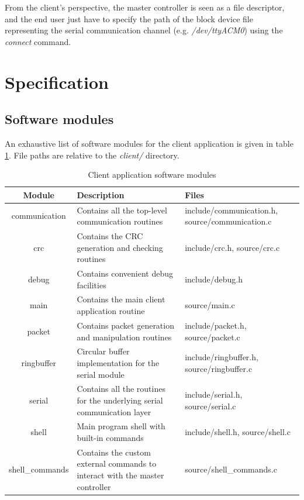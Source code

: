 \documentclass[binding=0.6cm,Lau]{sapthesis}
\begin{document}
From the client's perspective, the master controller is seen as a file
descriptor, and the end user just have to specify the path of the block device
file representing the serial communication channel (e.g. \emph{/dev/ttyACM0})
using the \emph{connect} command.

\section{Specification}

\subsection{Software modules}
An exhaustive list of software modules for the client application is given
in table \ref{tab:client-spec-modules}. File paths are relative to the
\emph{client/} directory.

\begin{table}[bh]
  \begin{tabularx}{\textwidth}{c X X}
    \toprule
    Module & Description & Files \\
    \midrule
    communication &
      Contains all the top-level communication routines &
      include/communication.h, source/communication.c \\
    crc &
      Contains the CRC generation and checking routines &
      include/crc.h, source/crc.c \\
    debug &
      Contains convenient debug facilities &
      include/debug.h \\
    main &
      Contains the main client application routine &
      source/main.c \\
    packet &
      Contains packet generation and manipulation routines &
      include/packet.h, source/packet.c \\
    ringbuffer &
      Circular buffer implementation for the serial module &
      include/ringbuffer.h, source/ringbuffer.c \\
    serial &
      Contains all the routines for the underlying serial communication layer &
      include/serial.h, source/serial.c \\
    shell &
      Main program shell with built-in commands &
      include/shell.h, source/shell.c \\
    shell\_commands &
      Contains the custom external commands to interact with the master controller &
      source/shell\_commands.c \\
    \bottomrule
  \end{tabularx}
  \caption{Client application software modules}
  \label{tab:client-spec-modules}
\end{table}
\end{document}
